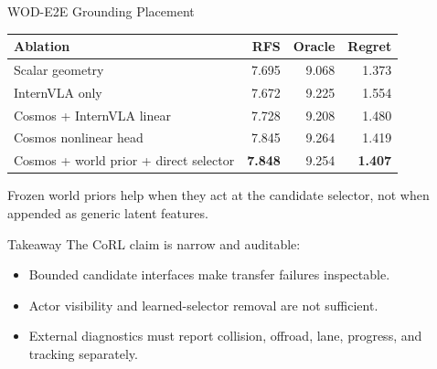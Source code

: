 \documentclass[aspectratio=169]{beamer}
\begin{document}
\begin{frame}{WOD-E2E Grounding Placement}
  \small
  \begin{tabular}{lrrr}
    \toprule
    Ablation & RFS & Oracle & Regret \\
    \midrule
    Scalar geometry & 7.695 & 9.068 & 1.373 \\
    InternVLA only & 7.672 & 9.225 & 1.554 \\
    Cosmos + InternVLA linear & 7.728 & 9.208 & 1.480 \\
    Cosmos nonlinear head & 7.845 & 9.264 & 1.419 \\
    Cosmos + world prior + direct selector & \textbf{7.848} & 9.254 & \textbf{1.407} \\
    \bottomrule
  \end{tabular}

  \vspace{0.8em}
  Frozen world priors help when they act at the candidate selector, not when appended as
  generic latent features.
\end{frame}

\begin{frame}{Takeaway}
  \Large
  The CoRL claim is narrow and auditable:

  \vspace{0.8em}
  \begin{itemize}
    \item Bounded candidate interfaces make transfer failures inspectable.
    \item Actor visibility and learned-selector removal are not sufficient.
    \item External diagnostics must report collision, offroad, lane, progress, and tracking separately.
  \end{itemize}
\end{frame}
\end{document}

